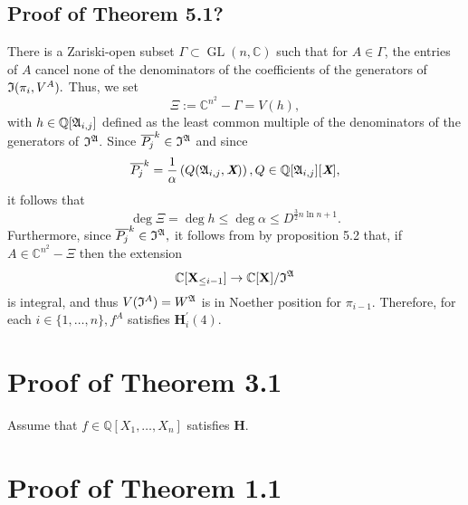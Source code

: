 \documentclass[sigconf]{acmart}
\def\Xb{\textit{\textbf{X}}}
\def\pjb{\overline{P_{j}}}
\DeclareMathOperator{\GL}{GL}
\def\C{\mathbb{C}}
\def\Q{\mathbb{Q}}
\def\I{\frak{I}}
\def\A{\frak{A}}
\begin{document}
\subsection{Proof of Theorem 5.1?}
%
There is a Zariski-open subset $\Gamma \subset \GL(n,\C)$ such that for $A \in \Gamma$, the entries of $A$ cancel none of the denominators of the coefficients of the generators of $\I(\pi_i,V^{A}).$ Thus, we set
\[
\Xi := \C^{n^2} - \Gamma = V(h),
\]
with $h \in \Q[\A_{i,j}]$ defined as the least common multiple of the denominators of the generators of $\I^\A.$ Since $\pjb^k \in \I^\A$ and since
\[
\pjb^k = \frac{1}{\alpha}\left( Q(\A_{i,j},\Xb) \right), Q \in \Q[\A_{i,j}][\Xb],
\]
it follows that 
\[
\deg \Xi = \deg h \leq \deg \alpha \leq D^{\frac{3}{2} n \ln n+1}.
\]
Furthermore, since $\pjb^k \in \I^\A,$ it follows from by proposition 5.2 that, if $A \in \C^{n^2} - \Xi$ then the extension  
\[
\C[\textbf{X}_{\leq i-1}]\rightarrow\C[\textbf{X}]/\frak{I}^\A
\]
is integral, and thus $V(\I^A)=W^\A$ is in Noether position for $\pi_{i-1}.$ Therefore, for each $i \in\{1,\hdots,n\}, f^A$ satisfies $\textbf{H}_i^{'}(4)$.
%
%
%
%
\section{Proof of Theorem 3.1}
%
Assume that $f\in \Q[X_1,\hdots,X_n]$ satisfies $\textbf{H}.$
%
%
%
%
\section{Proof of Theorem 1.1}
%
%






\end{document}
